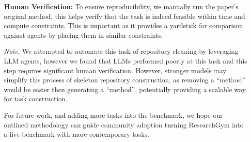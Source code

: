 \documentclass[11pt]{article}
\theoremstyle{plain}
\theoremstyle{definition}
\theoremstyle{remark}
\begin{document}
\textbf{Human Verification:} To ensure reproducibility, we manually run the paper's original method, this helps verify that the task is indeed feasible within time and compute constraints. This is important as it provides a yardstick for comparison against agents by placing them in similar constraints.

\textit{Note.} We attempted to automate this task of repository cleaning by leveraging LLM agents, however we found that LLMs performed poorly at this task and this step requires significant human verification. However, stronger models may simplify this process of skeleton repository construction, as removing a ``method'' would be easier then generating a ``method'', potentially providing a scalable way for task construction.


For future work, and adding more tasks into the benchmark,
we hope 
our outlined methodology can guide
community adoption turning ResearchGym into a live benchmark with more contemporary tasks.

\vspace{-5pt}
\end{document}
